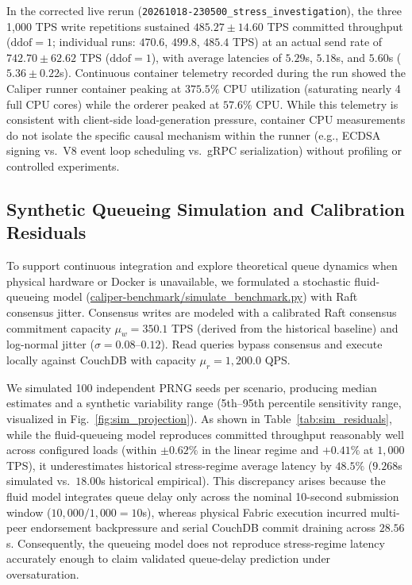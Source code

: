 \documentclass[runningheads]{llncs}
\begin{document}
In the corrected live rerun (\texttt{20261018-230500\_stress\_investigation}), the three 1,000 TPS write repetitions sustained $485.27 \pm 14.60$ TPS committed throughput ($\text{ddof}=1$; individual runs: $470.6$, $499.8$, $485.4$ TPS) at an actual send rate of $742.70 \pm 62.62$ TPS ($\text{ddof}=1$), with average latencies of $5.29$s, $5.18$s, and $5.60$s ($5.36 \pm 0.22$s). Continuous container telemetry recorded during the run showed the Caliper runner container peaking at $375.5\%$ CPU utilization (saturating nearly 4 full CPU cores) while the orderer peaked at $57.6\%$ CPU. While this telemetry is consistent with client-side load-generation pressure, container CPU measurements do not isolate the specific causal mechanism within the runner (e.g., ECDSA signing vs.\ V8 event loop scheduling vs.\ gRPC serialization) without profiling or controlled experiments.

\subsection{Synthetic Queueing Simulation and Calibration Residuals}
To support continuous integration and explore theoretical queue dynamics when physical hardware or Docker is unavailable, we formulated a stochastic fluid-queueing model (\url{caliper-benchmark/simulate_benchmark.py}) with Raft consensus jitter. Consensus writes are modeled with a calibrated Raft consensus commitment capacity $\mu_w = 350.1$ TPS (derived from the historical baseline) and log-normal jitter ($\sigma = 0.08$--$0.12$). Read queries bypass consensus and execute locally against CouchDB with capacity $\mu_r = 1,200.0$ QPS.

We simulated 100 independent PRNG seeds per scenario, producing median estimates and a synthetic variability range (5th--95th percentile sensitivity range, visualized in Fig.~\ref{fig:sim_projection}). As shown in Table~\ref{tab:sim_residuals}, while the fluid-queueing model reproduces committed throughput reasonably well across configured loads (within $\pm 0.62\%$ in the linear regime and $+0.41\%$ at $1,000$ TPS), it underestimates historical stress-regime average latency by $48.5\%$ ($9.268$s simulated vs.\ $18.00$s historical empirical). This discrepancy arises because the fluid model integrates queue delay only across the nominal 10-second submission window ($10,000 / 1,000 = 10$s), whereas physical Fabric execution incurred multi-peer endorsement backpressure and serial CouchDB commit draining across $28.56$s. Consequently, the queueing model does not reproduce stress-regime latency accurately enough to claim validated queue-delay prediction under oversaturation.
\end{document}
